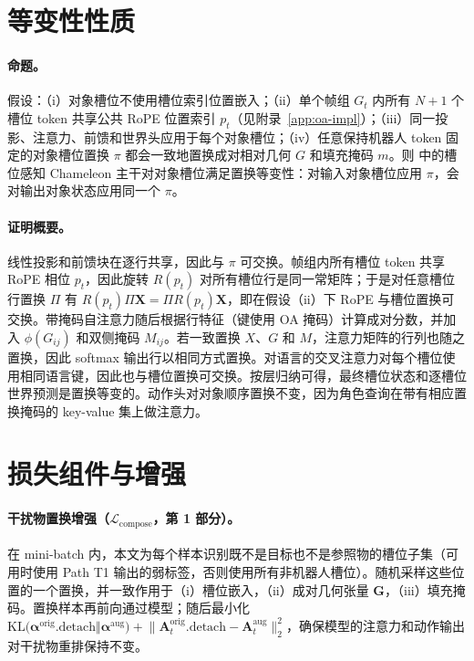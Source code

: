 \section{等变性性质}
\label{app:equivariance}

\paragraph{命题。}
假设：（i）对象槽位不使用槽位索引位置嵌入；（ii）单个帧组 $G_t$ 内所有 $N{+}1$ 个槽位 token 共享公共 RoPE 位置索引 $p_t$（见附录~\ref{app:oa-impl}）；（iii）同一投影、注意力、前馈和世界头应用于每个对象槽位；（iv）任意保持机器人 token 固定的对象槽位置换 $\pi$ 都会一致地置换成对相对几何 $G$ 和填充掩码 $m$。则 \method{}中的槽位感知 Chameleon 主干对对象槽位满足置换等变性：对输入对象槽位应用 $\pi$，会对输出对象状态应用同一个 $\pi$。

\paragraph{证明概要。}
线性投影和前馈块在逐行共享，因此与 $\pi$ 可交换。帧组内所有槽位 token 共享 RoPE 相位 $p_t$，因此旋转 $R(p_t)$ 对所有槽位行是同一常矩阵；于是对任意槽位行置换 $\Pi$ 有 $R(p_t)\Pi\mathbf{X}=\Pi R(p_t)\mathbf{X}$，即在假设（ii）下 RoPE 与槽位置换可交换。带掩码自注意力随后根据行特征（键使用 OA 掩码）计算成对分数，并加入 $\phi(G_{ij})$ 和双侧掩码 $M_{ij}$。若一致置换 $X$、$G$ 和 $M$，注意力矩阵的行列也随之置换，因此 softmax 输出行以相同方式置换。对语言的交叉注意力对每个槽位使用相同语言键，因此也与槽位置换可交换。按层归纳可得，最终槽位状态和逐槽位世界预测是置换等变的。动作头对对象顺序置换不变，因为角色查询在带有相应置换掩码的 key-value 集上做注意力。

\section{损失组件与增强}
\label{app:loss-detail}

\paragraph{干扰物置换增强（$\mathcal{L}_\mathrm{compose}$，第 1 部分）。}
在 mini-batch 内，本文为每个样本识别既不是目标也不是参照物的槽位子集（可用时使用 Path T1 输出的弱标签，否则使用所有非机器人槽位）。随机采样这些位置的一个置换，并一致作用于（i）槽位嵌入，（ii）成对几何张量 $\mathbf{G}$，（iii）填充掩码。置换样本再前向通过模型；随后最小化 $\mathrm{KL}\!\bigl(\boldsymbol{\alpha}^\text{orig}.\mathrm{detach}\Vert\boldsymbol{\alpha}^\text{aug}\bigr)+\bigl\|\mathbf{A}_t^\text{orig}.\mathrm{detach}-\mathbf{A}_t^\text{aug}\bigr\|_2^2$，确保模型的注意力和动作输出对干扰物重排保持不变。


